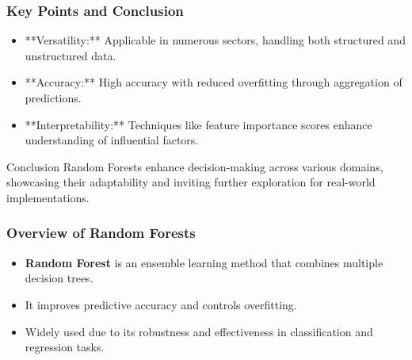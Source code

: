 \documentclass[aspectratio=169]{beamer}
\begin{document}
\begin{frame}[fragile]
    \frametitle{Key Points and Conclusion}
    \begin{itemize}
        \item **Versatility:** Applicable in numerous sectors, handling both structured and unstructured data.
        \item **Accuracy:** High accuracy with reduced overfitting through aggregation of predictions.
        \item **Interpretability:** Techniques like feature importance scores enhance understanding of influential factors.
    \end{itemize}
    \begin{block}{Conclusion}
        Random Forests enhance decision-making across various domains, showcasing their adaptability and inviting further exploration for real-world implementations.
    \end{block}
\end{frame}

\begin{frame}
    \titlepage
\end{frame}

\begin{frame}
    \frametitle{Overview of Random Forests}
    \begin{itemize}
        \item \textbf{Random Forest} is an ensemble learning method that combines multiple decision trees.
        \item It improves predictive accuracy and controls overfitting.
        \item Widely used due to its robustness and effectiveness in classification and regression tasks.
    \end{itemize}
\end{frame}
\end{document}
